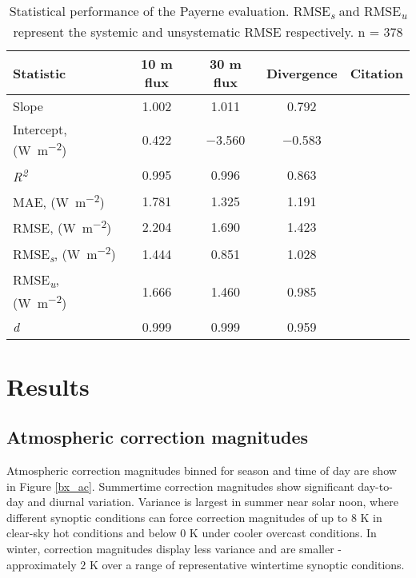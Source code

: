 \begin{table}[H]
	\centering
	\caption{Statistical performance of the Payerne evaluation. RMSE\textit{\textsubscript{s}} and RMSE\textit{\textsubscript{u}} represent the systemic and unsystematic RMSE respectively. n = 378}
	\label{evalstats}
	\begin{tabular*}{\textwidth}{l@{\extracolsep{\fill}} cccr}
		\toprule 
		Statistic & 10 \si{\meter} flux & 30 \si{\meter} flux & Divergence & Citation \\  \midrule
		Slope & 1.002 & 1.011 & 0.792 &  \\ 
		Intercept, (\si{\watt\per\meter\squared}) & 0.422 & $-$3.560 & $-$0.583 &   \\ 
		\textit{R\textsuperscript{2}} & 0.995 & 0.996 & 0.863 & \\ 
		MAE,  (\si{\watt\per\meter\squared}) & 1.781 & 1.325 & 1.191 & \cite{Willmott1985a} \\ 
		RMSE,  (\si{\watt\per\meter\squared}) & 2.204 & 1.690 & 1.423 & \cite{Willmott1985a} \\ 
		RMSE\textit{\textsubscript{s}},  (\si{\watt\per\meter\squared}) & 1.444 & 0.851 & 1.028 & \cite{Willmott1985a} \\ 
		RMSE\textit{\textsubscript{u}},  (\si{\watt\per\meter\squared}) & 1.666 & 1.460 & 0.985 & \cite{Willmott1985a} \\ 
		\textit{d} & 0.999 & 0.999 & 0.959 & \cite{Willmott2012} \\
		\bottomrule
	\end{tabular*} 
\end{table}

\section{Results}

\subsection{Atmospheric correction magnitudes}

Atmospheric correction magnitudes binned for season and time of day are show in Figure \ref{bx_ac}. Summertime correction magnitudes show significant day-to-day and diurnal variation. Variance is largest in summer near solar noon, where different synoptic conditions can force correction magnitudes of up to $8$ \si{\kelvin} in clear-sky hot conditions and below $0$ \si{\kelvin} under cooler overcast conditions. In winter, correction magnitudes display less variance and are smaller - approximately $2$ \si{\kelvin} over a range of representative wintertime synoptic conditions. 


